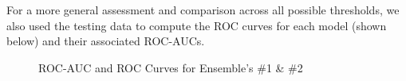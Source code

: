 \documentclass [MAS] {uclathes}
\begin{document}
For a more general assessment and comparison across all possible thresholds, we also used the testing data to compute the ROC curves for each model (shown below) and their associated ROC-AUCs.

\begin{figure}[hbt!]
\label{fig:roc}
\caption{ROC-AUC and ROC Curves for Ensemble's \#1 \& \#2}
\end{figure}
\end{document}
